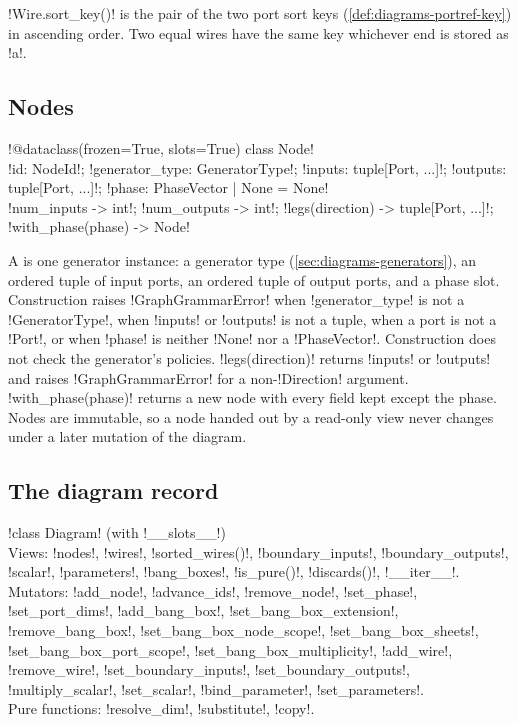 \begin{definition}\label{def:diagrams-wire-key}
\py!Wire.sort_key()! is the pair of the two port sort keys (\cref{def:diagrams-portref-key}) in ascending order. Two equal wires have the same key whichever end is stored as \py!a!.
\end{definition}

\subsection{Nodes}

\begin{signature}
\py!@dataclass(frozen=True, slots=True) class Node!\\
\quad \py!id: NodeId!; \py!generator_type: GeneratorType!; \py!inputs: tuple[Port, ...]!; \py!outputs: tuple[Port, ...]!; \py!phase: PhaseVector | None = None!\\
\quad \py!num_inputs -> int!; \py!num_outputs -> int!; \py!legs(direction) -> tuple[Port, ...]!; \py!with_phase(phase) -> Node!
\end{signature}

A  is one generator instance: a generator type (\cref{sec:diagrams-generators}), an ordered tuple of input ports, an ordered tuple of output ports, and a phase slot. Construction raises \py!GraphGrammarError! when \py!generator_type! is not a \py!GeneratorType!, when \py!inputs! or \py!outputs! is not a tuple, when a port is not a \py!Port!, or when \py!phase! is neither \py!None! nor a \py!PhaseVector!. Construction does not check the generator's policies. \py!legs(direction)! returns \py!inputs! or \py!outputs! and raises \py!GraphGrammarError! for a non-\py!Direction! argument. \py!with_phase(phase)! returns a new node with every field kept except the phase. Nodes are immutable, so a node handed out by a read-only view never changes under a later mutation of the diagram.

\subsection{The diagram record}

\begin{signature}
\py!class Diagram! (with \py!__slots__!)\\
\quad Views: \py!nodes!, \py!wires!, \py!sorted_wires()!, \py!boundary_inputs!, \py!boundary_outputs!, \py!scalar!, \py!parameters!, \py!bang_boxes!, \py!is_pure()!, \py!discards()!, \py!__iter__!.\\
\quad Mutators: \py!add_node!, \py!advance_ids!, \py!remove_node!, \py!set_phase!, \py!set_port_dims!, \py!add_bang_box!, \py!set_bang_box_extension!, \py!remove_bang_box!, \py!set_bang_box_node_scope!, \py!set_bang_box_sheets!, \py!set_bang_box_port_scope!, \py!set_bang_box_multiplicity!, \py!add_wire!, \py!remove_wire!, \py!set_boundary_inputs!, \py!set_boundary_outputs!, \py!multiply_scalar!, \py!set_scalar!, \py!bind_parameter!, \py!set_parameters!.\\
\quad Pure functions: \py!resolve_dim!, \py!substitute!, \py!copy!.
\end{signature}

